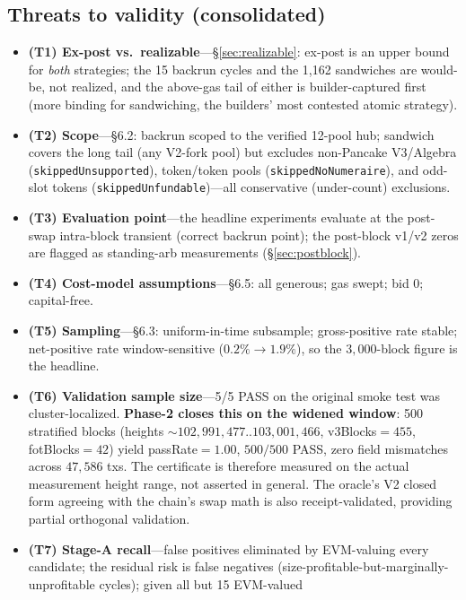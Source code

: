 \documentclass[11pt]{article}
\newcommand{\code}[1]{\texttt{#1}}
\begin{document}
\subsection{Threats to validity (consolidated)}
\label{sec:threats}
\begin{itemize}
  \item \textbf{(T1) Ex-post vs.\ realizable}---\S\ref{sec:realizable}: ex-post is an
    upper bound for \emph{both} strategies; the 15 backrun cycles and the 1{,}162
    sandwiches are would-be, not realized, and the above-gas tail of either is
    builder-captured first (more binding for sandwiching, the builders' most contested
    atomic strategy).
  \item \textbf{(T2) Scope}---\S6.2: backrun scoped to the verified 12-pool hub;
    sandwich covers the long tail (any V2-fork pool) but excludes non-Pancake
    V3/Algebra (\code{skippedUnsupported}), token/token pools
    (\code{skippedNoNumeraire}), and odd-slot tokens (\code{skippedUnfundable})---all
    conservative (under-count) exclusions.
  \item \textbf{(T3) Evaluation point}---the headline experiments evaluate at the
    post-swap intra-block transient (correct backrun point); the post-block v1/v2
    zeros are flagged as standing-arb measurements (\S\ref{sec:postblock}).
  \item \textbf{(T4) Cost-model assumptions}---\S6.5: all generous; gas swept; bid 0;
    capital-free.
  \item \textbf{(T5) Sampling}---\S6.3: uniform-in-time subsample; gross-positive rate
    stable; net-positive rate window-sensitive ($0.2\%\to1.9\%$), so the
    $3{,}000$-block figure is the headline.
  \item \textbf{(T6) Validation sample size}---5/5 PASS on the original smoke test was
    cluster-localized. \textbf{Phase-2 closes this on the widened window}: 500 stratified
    blocks (heights $\sim$$102{,}991{,}477..103{,}001{,}466$, v3Blocks$=455$,
    fotBlocks$=42$) yield passRate$=1.00$, $500/500$ PASS, zero field mismatches across
    $47{,}586$ txs. The certificate is therefore measured on the actual measurement
    height range, not asserted in general. The oracle's V2 closed form agreeing with
    the chain's swap math is also receipt-validated, providing partial
    orthogonal validation.
  \item \textbf{(T7) Stage-A recall}---false positives eliminated by EVM-valuing every
    candidate; the residual risk is false negatives
    (size-profitable-but-marginally-unprofitable cycles); given all but 15 EVM-valued
$$
\end{itemize}
\end{document}

